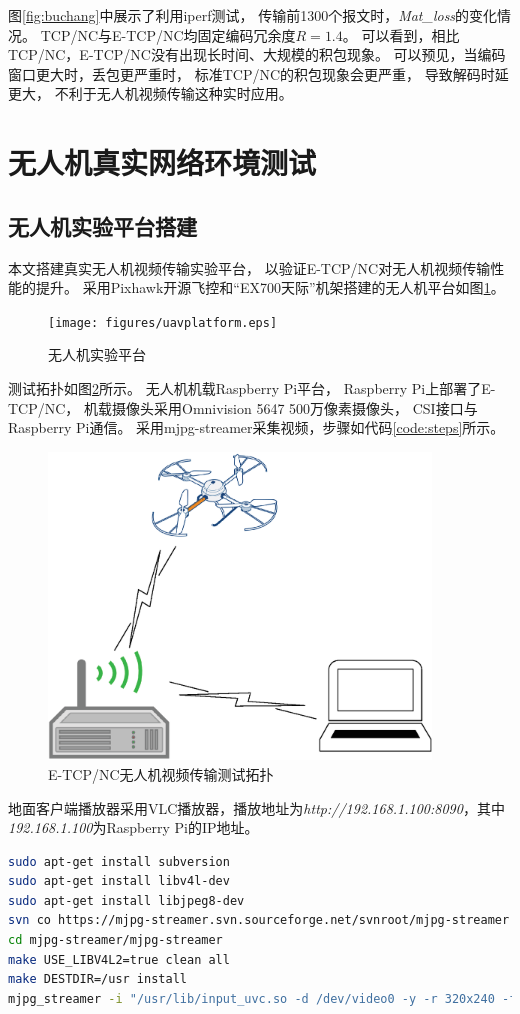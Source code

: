 \par
图\ref{fig:buchang}中展示了利用iperf测试，
传输前1300个报文时，\emph{Mat\_loss}的变化情况。
TCP/NC与E-TCP/NC均固定编码冗余度$R=1.4$。
可以看到，相比TCP/NC，E-TCP/NC没有出现长时间、大规模的积包现象。
可以预见，当编码窗口更大时，丢包更严重时，
标准TCP/NC的积包现象会更严重，
导致解码时延更大，
不利于无人机视频传输这种实时应用。
\section{无人机真实网络环境测试}
\subsection{无人机实验平台搭建}
本文搭建真实无人机视频传输实验平台，
以验证E-TCP/NC对无人机视频传输性能的提升。
采用Pixhawk开源飞控和“EX700天际”机架搭建的无人机平台如图\ref{fig:uavpingtai}。

\begin{figure}[htbp]
	\centering
	\texttt{[image: figures/uavplatform.eps]}
	\caption{无人机实验平台}
	\label{fig:uavpingtai}
\end{figure}



测试拓扑如图\ref{fig:uav}所示。
无人机机载Raspberry Pi平台，
Raspberry Pi上部署了E-TCP/NC，
机载摄像头采用Omnivision 5647 500万像素摄像头，
CSI接口与Raspberry Pi通信。
采用mjpg-streamer采集视频，步骤如代码\ref{code:steps}所示。
\begin{figure}[htbp]
	\centering
	\includegraphics[width=4in]{figures/uav.eps}
	\caption{E-TCP/NC无人机视频传输测试拓扑}
	\label{fig:uav}
\end{figure}
\par
\par
地面客户端播放器采用VLC播放器，播放地址为\emph{http://192.168.1.100:8090}，其中\emph{192.168.1.100}为Raspberry Pi的IP地址。
\begin{lstlisting}[float,caption=摄像头配置步骤,label={code:steps},language={bash}]
sudo apt-get install subversion
sudo apt-get install libv4l-dev
sudo apt-get install libjpeg8-dev
svn co https://mjpg-streamer.svn.sourceforge.net/svnroot/mjpg-streamer mjpg-streamer
cd mjpg-streamer/mjpg-streamer
make USE_LIBV4L2=true clean all
make DESTDIR=/usr install
mjpg_streamer -i "/usr/lib/input_uvc.so -d /dev/video0 -y -r 320x240 -f 15" -o "/usr/lib/output_http.so -p 8090 -w ./www"
\end{lstlisting}


